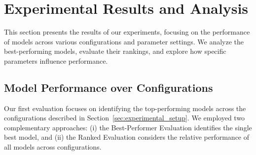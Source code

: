 \section{Experimental Results and Analysis}\label{sec:results}
This section presents the results of our experiments, focusing on the performance of models across various configurations and parameter settings. We analyze the best-performing models, evaluate their rankings, and explore how specific parameters influence performance.



\subsection{Model Performance over Configurations}\label{sec:best_models}

Our first evaluation focuses on identifying the top-performing models across the configurations described in Section~\ref{sec:experimental_setup}. We employed two complementary approaches: (i) the Best-Performer Evaluation identifies the single best model, and (ii) the Ranked Evaluation considers the relative performance of all models across configurations.

